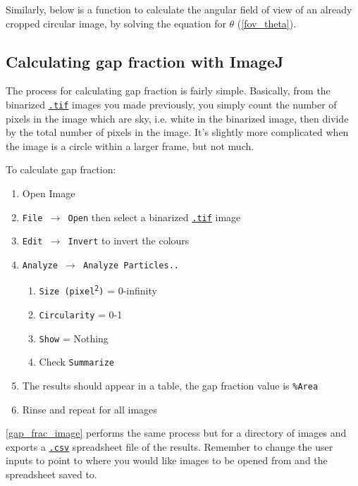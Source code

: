\documentclass[11pt,a4paper]{article}
\newcommand\menu[1]{\texttt{\color{blue}#1}}
\newcommand\file[1]{\texttt{\underline{#1}}}
\begin{document}
Similarly, below is a function to calculate the angular field of view of an already cropped circular image, by solving the equation for $\theta$ (\autoref{fov_theta}). 

\begin{minipage}{\linewidth}

\end{minipage}

\subsection{Calculating gap fraction with ImageJ}

The process for calculating gap fraction is fairly simple. Basically, from the binarized \file{.tif} images you made previously, you simply count the number of pixels in the image which are sky, i.e. white in the binarized image, then divide by the total number of pixels in the image. It's slightly more complicated when the image is a circle within a larger frame, but not much.

To calculate gap fraction: 

\begin{enumerate}
	\item{Open Image}
	\item{\menu{File $\rightarrow$ Open} then select a binarized \file{.tif} image} 
	\item{\menu{Edit $\rightarrow$ Invert} to invert the colours}
	\item{\menu{Analyze $\rightarrow$ Analyze Particles..}}
		\begin{enumerate}
			\item{\menu{Size (pixel\textsuperscript{2})} = 0-infinity}
			\item{\menu{Circularity} = 0-1}
			\item{\menu{Show} = Nothing}
			\item{Check \menu{Summarize}}
		\end{enumerate}
	\item{The results should appear in a table, the gap fraction value is \menu{\%Area}}
	\item{Rinse and repeat for all images}
\end{enumerate}

\autoref{gap_frac_image} performs the same process but for a directory of images and exports a \file{.csv} spreadsheet file of the results. Remember to change the user inputs to point to where you would like images to be opened from and the spreadsheet saved to.
\end{document}
